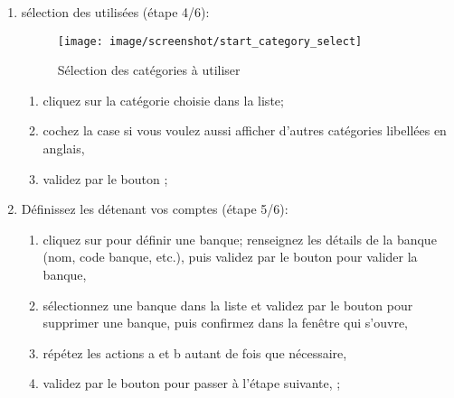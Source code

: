 \begin{enumerate}
	\item sélection des  utilisées (étape 4/6):
	
	\begin{figure}[htbp]
	\begin{center}
		\texttt{[image: image/screenshot/start\_category\_select]}
	\end{center}
	\caption{Sélection des catégories à utiliser}
	\label{start_category_select}
	\end{figure}
		
		\begin{enumerate} 
		 	\item cliquez sur la catégorie choisie dans la liste;
			\item cochez la case  si vous voulez aussi afficher d'autres catégories libellées en anglais,
			\item validez par le bouton ;
		\end{enumerate}		

	\item Définissez les  détenant vos comptes (étape 5/6):
		\begin{enumerate} 
		 	\item cliquez sur  pour définir une banque; renseignez les détails de la banque (nom, code banque, etc.), puis validez par le bouton  pour valider la banque,
			\item sélectionnez une banque dans la liste et validez par le bouton  pour supprimer une banque, puis confirmez dans la fenêtre qui s'ouvre,
			\item répétez les actions a et b autant de fois que nécessaire,
			\item validez par le bouton  pour passer à l'étape suivante, ;
		\end{enumerate}		 	


\end{enumerate}
